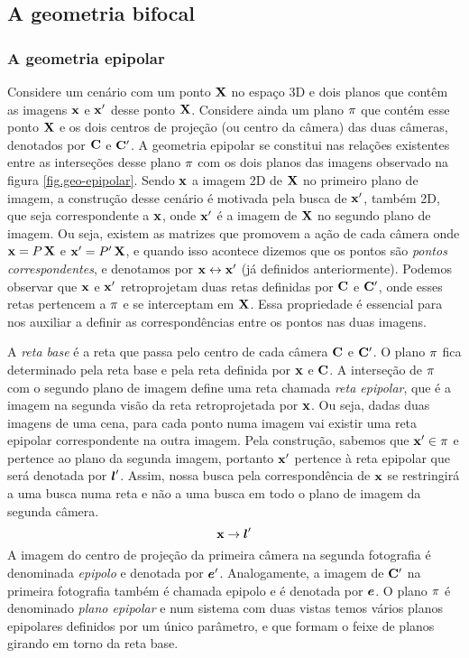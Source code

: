 \subsection{A geometria bifocal}

\subsubsection*{A geometria epipolar}

Considere um cenário com um ponto $\mathbf{X}$ no espaço 3D e dois planos que contêm as imagens $\mathbf{x}$ e $\mathbf{x}'$ desse ponto $\mathbf{X}$. Considere ainda um plano $\pi$ que contém esse ponto $\mathbf{X}$ e os dois centros de projeção (ou centro da câmera) das duas câmeras, denotados por ${\bf C}$ e ${\bf C}'$. A geometria epipolar se constitui nas relações existentes entre as interseções desse plano $\pi$ com os dois planos das imagens observado na figura \ref{fig.geo-epipolar}. Sendo $\mathbf{x}$ a imagem 2D de $\mathbf{X}$ no primeiro plano de imagem, a construção desse cenário é motivada pela busca de $\mathbf{x}'$, também 2D, que seja correspondente a $\mathbf{x}$, onde $\mathbf{x}'$ é a imagem de $\mathbf{X}$ no segundo plano de imagem. Ou seja, existem as matrizes que promovem a ação de cada câmera onde $\mathbf{x}=P\,\mathbf{X}$ e $\mathbf{x}'=P'\,\mathbf{X}$, e quando isso acontece dizemos que os pontos são {\it pontos correspondentes}, e denotamos por $\mathbf{x}\leftrightarrow\mathbf{x}'$ (já definidos anteriormente). Podemos observar que $\mathbf{x}$ e $\mathbf{x}'$ retroprojetam duas retas definidas por ${\bf C}$ e ${\bf C}'$, onde esses retas pertencem a $\pi$ e se interceptam em $\mathbf{X}$. Essa propriedade é essencial para nos auxiliar a definir as correspondências entre os pontos nas duas imagens. 

A \textit{reta base} é a reta que passa pelo centro de cada câmera ${\bf C}$ e ${\bf C}'$. O plano $\pi$ fica determinado pela reta base e pela reta definida por $\mathbf{x}$ e ${\bf C}$. A interseção de $\pi$ com o segundo plano de imagem define uma reta chamada \textit{reta epipolar}, que é a imagem na segunda visão da reta retroprojetada por $\mathbf{x}$. Ou seja, dadas duas imagens de uma cena, para cada ponto numa imagem vai existir uma reta epipolar correspondente na outra imagem. Pela construção, sabemos que $\mathbf{x}'\in\pi$ e pertence ao plano da segunda imagem, portanto $\mathbf{x}'$ pertence à reta epipolar que será denotada por $\boldsymbol{l}'$. Assim, nossa busca pela correspondência de $\mathbf{x}$ se restringirá a uma busca numa reta e não a uma busca em todo o plano de imagem da segunda câmera. 
\begin{equation*}
\mathbf{x}\rightarrow\boldsymbol{l}'
\end{equation*}
A imagem do centro de projeção da primeira câmera na segunda fotografia é denominada \textit{epipolo} e denotada por $\boldsymbol{e}'$. Analogamente, a imagem de ${\bf C}'$ na primeira fotografia também é chamada epipolo e é denotada por $\boldsymbol{e}$.
O plano $\pi$ é denominado \textit{plano epipolar} e num sistema com duas vistas temos vários planos epipolares definidos por um único parâmetro, e que formam o feixe de planos girando em torno da reta base.

